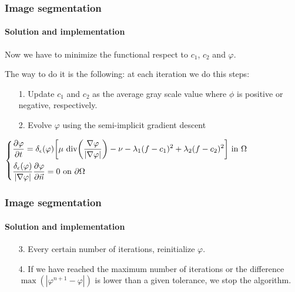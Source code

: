 \documentclass[11pt]{beamer}
\begin{document}
\begin{frame}
\frametitle{Image segmentation}
\framesubtitle{Solution and implementation}
Now we have to minimize the functional respect to $c_1$, $c_2$ and $\varphi$.

The way to do it is the following: at each iteration we do this steps:
\begin{enumerate}
\item[1.] Update $c_1$ and $c_2$ as the average gray scale value where $\phi$ is positive or negative, respectively.

\item [2.] Evolve $\varphi$ using the semi-implicit gradient descent 


\end{enumerate}
\begin{flushleft}
$
\begin{dcases}
\frac{\partial \varphi}{\partial t} = \delta_{\epsilon}(\varphi)\bigg[\mu \text{ div}\bigg(\frac{\nabla\varphi}{|\nabla\varphi|}\bigg) - \nu-\lambda_1(f-c_1)^2+\lambda_2(f-c_2)^2\bigg]\ \text{in }\Omega \\
\frac{\delta_{\epsilon}(\varphi)}{|\nabla\varphi|}\frac{\partial \varphi}{\partial \vec{n}} = 0\ \text{on }\partial\Omega 
\end{dcases}$
\end{flushleft}

\end{frame}
\begin{frame}
\frametitle{Image segmentation}
\framesubtitle{Solution and implementation}
\begin{itemize}
\item [3.] Every certain number of iterations, reinitialize $\varphi$.
\item [4.] If we have reached the maximum number of iterations or the difference $\max(|\varphi^{n+1}-\varphi|)$ is lower than a given tolerance, we stop the algorithm.
\end{itemize}
\end{frame}
\end{document}
